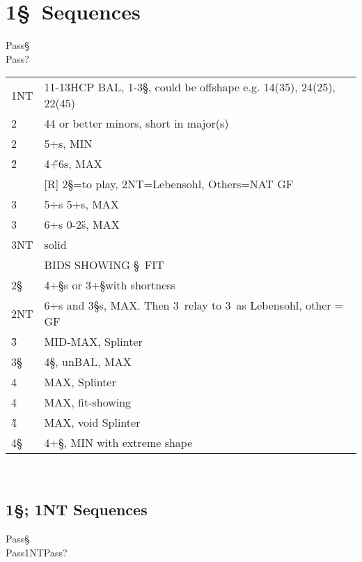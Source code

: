 \section{1\S\ Sequences}

\begin{bidding}
\>\D\>Pass\S\\
\>Pass\>?\\
\end{bidding}

\begin{xtabular}{ll}
1NT & 11-13HCP BAL, 1-3\S, could be offshape e.g. 14(35), 24(25), 22(45) \\
2\C & 44 or better minors, short in major(s) \\
2\D & 5+\D s, MIN \\
2\H & 4\H+6\D s, MAX \\
	& [R] 2\S=to play, 2NT=Lebensohl, Others=NAT GF \\
3\C & 5+\D s 5+\C s, MAX \\
3\D & 6+\D s 0-2\H s, MAX \\
3NT & solid \D \\
\hline 
       & BIDS SHOWING \S\ FIT \\
2\S & 4+\S s or 3+\S with shortness \\
2NT & 6+\D s and 3\S s, MAX. Then 3\C\ relay to 3\D\ as Lebensohl, other = GF  \\
3\H & MID-MAX, Splinter \\
3\S & 4\S, unBAL, MAX \\
4\C & MAX, Splinter \\
4\D & MAX, fit-showing \\
4\H & MAX, void Splinter \\
4\S & 4+\S, MIN with extreme shape \\
\end{xtabular}\\


\subsection{1\S; 1NT Sequences}

\begin{bidding}
\>\D\>Pass\S\\
\>Pass\>1NT\>Pass\>?\\
\end{bidding}

